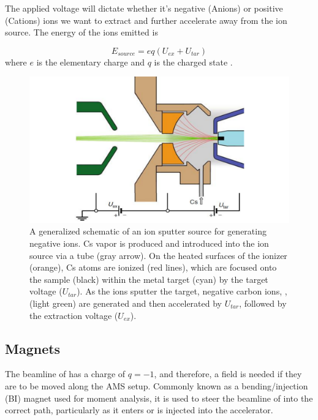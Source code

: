The applied voltage will dictate whether it's negative (Anions) or positive (Cations) ions we want to extract and further accelerate away from the ion source. The energy of the ions emitted is

\begin{equation}
    E_{source} =  eq (U_{ex}+U_{tar})
\end{equation}
where $e$ is the elementary charge and $q$ is the charged state \cite{schuur2013radiocarbon}.

\begin{figure}[ht]
    \centering
    \includegraphics[width=1\columnwidth]{B/Generalized schematic of a sputter ion source.pdf}
    \caption{A generalized schematic of an ion sputter source for generating negative ions. Cs vapor is produced and introduced into the ion source via a tube (gray arrow). On the heated surfaces of the ionizer (orange), Cs atoms are ionized (red lines), which are focused onto the sample (black) within the metal target (cyan) by the target voltage ($U_{tar}$). As the  ions sputter the target, negative carbon ions, , (light green) are generated and then accelerated by $U_{tar}$, followed by the extraction voltage ($U_{ex}$).}
    \label{fig: Sputter ion source}
\end{figure}

\subsection{Magnets}\label{Magnetssection}
The beamline of  has a charge of $q = -1$, and therefore, a field is needed if they are to be moved along the AMS setup. 
Commonly known as a bending/injection (BI) magnet used for moment analysis, it is used to steer the beamline of  into the correct path, particularly as it enters or is injected into the accelerator.\\

